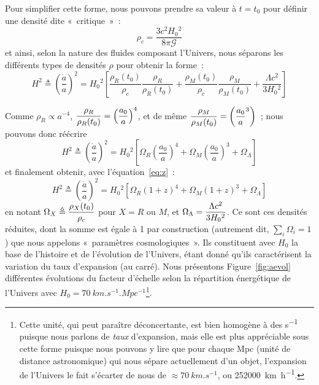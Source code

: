 \documentclass[../main/main.tex]{subfiles}
\begin{document}
Pour simplifier cette forme, nous pouvons prendre sa valeur à $t = t_0$ pour
définir une densité dite «~critique~»~:
\begin{equation}
    \rho_c = \frac{3c^2H_0{}^2}{8\pi\mathcal{G}}
\end{equation}
et ainsi, selon la nature des fluides composant l'Univers, nous séparons les
différents types de densités $\rho$ pour obtenir la forme~:
\begin{equation}
    H^2 \triangleq \left( \frac{\dot{a}}{a} \right)^2 =
    H_0{}^2 \left[ \frac{\rho_R(t_0)}{\rho_c}\frac{\rho_R}{\rho_R(t_0)} +
                   \frac{\rho_M(t_0)}{\rho_c}\frac{\rho_M}{\rho_M(t_0)} +
                   \frac{\Lambda c^2}{3 H_0{}^2}
               \right]
\end{equation}

Comme $\rho_R \propto a^{-4}$, $\displaystyle\frac{\rho_R}{\rho_R(t_0)} =
\left(\frac{a_0}{a}\right)^4$, et de même $\displaystyle\frac{\rho_M}{\rho_M(t_0)} =
\left(\frac{a_0}{a}^3\right)$~;
nous pouvons donc réécrire
\begin{equation}
    H^2 \triangleq \left( \frac{\dot{a}}{a} \right)^2 =
    H_0{}^2 \left[ \Omega_R \left( \frac{a_0}{a} \right)^4 +
        \Omega_M \left( \frac{a_0}{a} \right)^3 +
    \Omega_\Lambda \right]
\end{equation}
et finalement obtenir, avec l'équation~\ref{eq:z}~:
\begin{equation}\label{eq:h2}
    H^2 \triangleq \left( \frac{\dot{a}}{a} \right)^2 =
    H_0{}^2 \left[ \Omega_R \left( 1+z \right)^4 +
        \Omega_M \left( 1+z \right)^3 +
    \Omega_\Lambda \right]
\end{equation}
en notant $\Omega_X \triangleq \displaystyle \frac{\rho_X(t_0)}{\rho_c}$ pour $X = R$ ou
$M$, et $\Omega_\Lambda = \displaystyle \frac{\Lambda c^2}{3 H_0{}^2}$. Ce sont ces
densités réduites, dont la somme est égale à 1 par construction (autrement dit,
$\sum_i \Omega_i = 1$) que nous appelons «~paramètres cosmologiques~». Ils
constituent avec $H_0$ la base de l'histoire et de l'évolution de l'Univers,
étant donné qu'ils caractérisent la variation du taux d'expansion (au carré).
Nous présentons Figure~\ref{fig:aevol} différentes évolutions du facteur
d'échelle selon la répartition énergétique de l'Univers avec $H_0 =
\SI{70}{km.s^{-1}.Mpc^{-1}}$\footnote{Cette unité, qui peut paraître
    déconcertante, est bien homogène à des \si{s^{-1}} puisque nous parlons de
    \textit{taux} d'expansion, mais elle est plus appréciable sous cette forme
    puisque nous pouvons y lire que pour chaque \si{Mpc} (unité de distance
    astronomique) qui nous sépare actuellement d'un objet, l'expansion de
    l'Univers le fait s'écarter de nous de $\approx \SI{70}{km.s^{-1}}$, ou
\SI{252000}{km.h^{-1}}.}.
\end{document}
